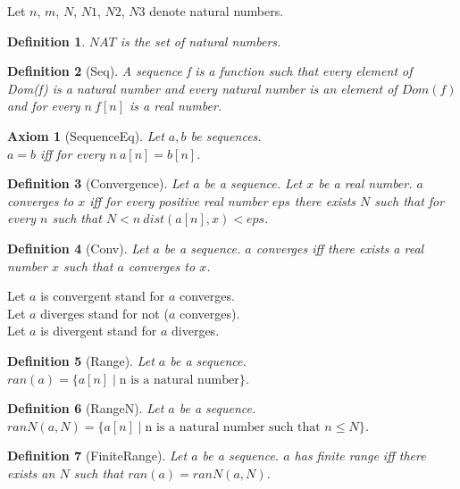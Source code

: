 \documentclass{article}
\newenvironment{forthel}{\begin{leftbar}}{\end{leftbar}}
\newtheorem{axiom}{Axiom}
\newtheorem{definition}{Definition}
\begin{document}
\begin{forthel}
	
	Let $n$, $m$, $N$, $N1$, $N2$, $N3$ denote natural numbers.
	
	\begin{definition}
		$NAT$ is the set of natural numbers.
	\end{definition}
	
	\begin{definition}[Seq]	A sequence f is a function such that every element of Dom(f) is a natural number and every
	natural number is an element of $Dom(f)$ and for every $n \ f[n]$ is a real number.
	\end{definition}
	
	\begin{axiom} [SequenceEq] Let $a, b$ be sequences. \\ $a = b$ iff for every $n \ a[n] = b[n]$.
	\end{axiom}
	
	\begin{definition} [Convergence] Let $a$ be a sequence. Let $x$ be a real number. $a$ converges to $x$ iff for every positive real
	number $eps$ there exists $N$ such that for every $n$ such that $N < n \ dist(a[n],x) < eps$.
	\end{definition}
	
	\begin{definition} [Conv] Let $a$ be a sequence. $a$ converges iff there exists a real number $x$ such that $a$ converges to $x$.
	\end{definition}
	
	\noindent Let $a$ is convergent stand for $a$ converges.
	\\Let $a$ diverges stand for not ($a$ converges).
	\\Let $a$ is divergent stand for $a$ diverges.
	
	\begin{definition} [Range] Let $a$ be a sequence. $ran(a) = \{a[n] \mid \text{n is a natural number}\}$. 
	\end{definition}

	\begin{definition} [RangeN] Let $a$ be a sequence. $ranN(a,N) = \{a[n] \mid \text{n is a natural number such that } n \leq N\}$.
	\end{definition}
	
	\begin{definition} [FiniteRange]	Let $a$ be a sequence. $a$ has finite range iff there exists an $N$ such that $ran(a) = ranN(a,N)$.
	\end{definition}


\end{forthel}
\end{document}
